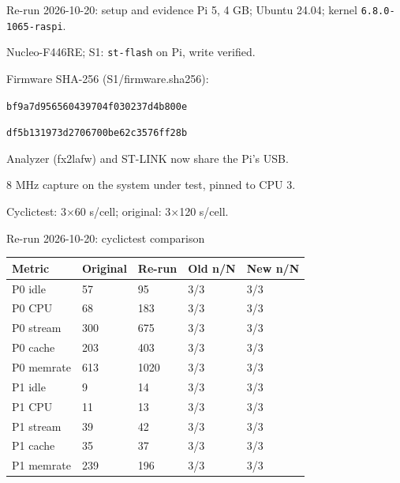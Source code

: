 \begin{frame}[t]{Re-run 2026-10-20: setup and evidence}
Pi 5, 4 GB; Ubuntu 24.04; kernel \texttt{6.8.0-1065-raspi}.\par
Nucleo-F446RE; S1: \texttt{st-flash} on Pi, write verified.\par\smallskip
Firmware SHA-256 (S1/firmware.sha256):\par
{\tiny\texttt{bf9a7d956560439704f030237d4b800e}\par\texttt{df5b131973d2706700be62c3576ff28b}}\par\medskip
Analyzer (fx2lafw) and ST-LINK now share the Pi's USB.\par
8 MHz capture on the system under test, pinned to CPU 3.\par\medskip
Cyclictest: 3\(\times\)60 s/cell; original: 3\(\times\)120 s/cell.
\end{frame}

\begin{frame}[t]{Re-run 2026-10-20: cyclictest comparison}
{\small\begin{tabular}{@{}lllll@{}}\toprule
Metric & Original & Re-run & Old n/N & New n/N \\\midrule
P0 idle & 57 & 95 & 3/3 & 3/3 \\
P0 CPU & 68 & 183 & 3/3 & 3/3 \\
P0 stream & 300 & 675 & 3/3 & 3/3 \\
P0 cache & 203 & 403 & 3/3 & 3/3 \\
P0 memrate & 613 & 1020 & 3/3 & 3/3 \\
P1 idle & 9 & 14 & 3/3 & 3/3 \\
P1 CPU & 11 & 13 & 3/3 & 3/3 \\
P1 stream & 39 & 42 & 3/3 & 3/3 \\
P1 cache & 35 & 37 & 3/3 & 3/3 \\
P1 memrate & 239 & 196 & 3/3 & 3/3 \\
\bottomrule\end{tabular}}
\end{frame}

